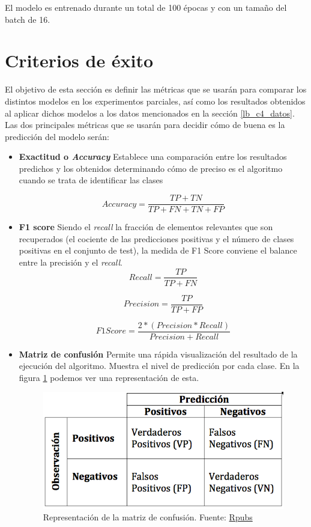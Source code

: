 \documentclass[11pt,a4paper,spanish]{book}
\begin{document}
	El modelo es entrenado durante un total de 100 épocas y con un tamaño del batch de 16.
	
	\section{Criterios de éxito}
	El objetivo de esta sección es definir las métricas que se usarán para comparar los distintos modelos en los experimentos parciales, así como los resultados obtenidos al aplicar dichos modelos a los datos mencionados en la sección \ref{lb_c4_datos}.\\
	Las dos principales métricas que se usarán para decidir cómo de buena es la predicción del modelo serán:
	\begin{itemize}
		\item \textbf{Exactitud o \emph{Accuracy} } Establece una comparación entre los resultados predichos y los obtenidos determinando cómo de preciso es el algoritmo cuando se trata de identificar las clases
		
			\[
				Accuracy = \frac{TP + TN}{ TP + FN + TN + FP} 
			\]
 			\hfill \break

		\item \textbf{F1 score} Siendo el \emph{recall} la fracción de elementos relevantes que son recuperados (el cociente de las predicciones positivas y el número de clases positivas en el conjunto de test), la medida de F1 Score conviene el balance entre la precisión y el \emph{recall}.
		\[
			Recall = \frac{TP}{ TP + FN} 
		\]
		
		\[
			Precision = \frac{TP}{TP + FP}
		\]
		
		\[
			F1 Score = \frac{2 * (Precision * Recall)}{Precision + Recall}
		\]
		\hfill \break
		
		\item \textbf{Matriz de confusión} Permite una rápida visualización del resultado de la ejecución del algoritmo. Muestra el nivel de predicción por cada clase. En la figura \ref{fig:confusionMatrix} podemos ver una representación de esta.
		
		\begin{figure}[h]
			\centering
			\includegraphics[scale=0.3]{confusionMatrix.png}
			\caption{Representación de la matriz de confusión. Fuente: \href{https://rpubs.com/chzelada/275494}{Rpubs}}
			\label{fig:confusionMatrix}
		\end{figure}
	
	\end{itemize}
\end{document}
